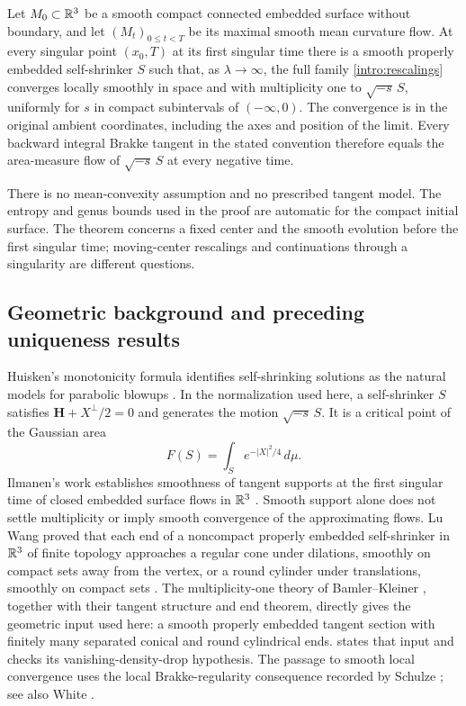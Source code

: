 \begin{theorem}\label{thm:main}
Let $M_0\subset\mathbb R^3$ be a smooth compact connected embedded surface
without boundary, and let $(M_t)_{0\le t<T}$ be its maximal smooth
mean curvature flow.  At every singular point $(x_0,T)$ at its first
singular time there is a smooth properly embedded self-shrinker $S$
such that, as $\lambda\to\infty$, the full family
\eqref{intro:rescalings} converges locally smoothly in space and with
multiplicity one to $\sqrt{-s}\,S$, uniformly for $s$ in compact
subintervals of $(-\infty,0)$.  The convergence is in the original
ambient coordinates, including the axes and position of the limit.
Every backward integral Brakke tangent in the stated convention
therefore equals the area-measure flow of $\sqrt{-s}\,S$ at every
negative time.
\end{theorem}

There is no mean-convexity assumption and no prescribed tangent model.
The entropy and genus bounds used in the proof are automatic for the
compact initial surface. The theorem concerns a fixed center and the
smooth evolution before the first singular time; moving-center
rescalings and continuations through a singularity are different questions.

\subsection{Geometric background and preceding uniqueness results}

Huisken's monotonicity formula identifies self-shrinking solutions as
the natural models for parabolic blowups \cite{Huisken1990}. In the
normalization used here, a self-shrinker $S$ satisfies
$\mathbf H+X^\perp/2=0$ and generates the motion $\sqrt{-s}\,S$.
It is a critical point of the Gaussian area
\[
 F(S)=\int_S e^{-|X|^2/4}\,d\mu.
\]
Ilmanen's work establishes smoothness of tangent supports at the first
singular time of closed embedded surface flows in $\mathbb R^3$
\cite[Theorems~1 and~2]{Ilmanen1995}. Smooth support alone
does not settle multiplicity or imply smooth convergence of the
approximating flows. Lu Wang proved that each end of a noncompact
properly embedded self-shrinker in $\mathbb R^3$ of finite topology approaches
a regular cone under dilations, smoothly on compact sets away from the
vertex, or a round cylinder under translations, smoothly on compact
sets \cite[Theorem~1.1]{Wang2016}. The
multiplicity-one theory of Bamler--Kleiner
\cite{BK2024}, together with their tangent structure and end theorem,
directly gives the geometric input used here: a smooth properly embedded tangent
section with finitely many separated conical and round cylindrical
ends.  states that input and checks its
vanishing-density-drop hypothesis. The passage to smooth local
convergence uses the local Brakke-regularity consequence recorded by
Schulze \cite[Lemma~2.1]{Schulze2014}; see also White \cite{White2005}.

